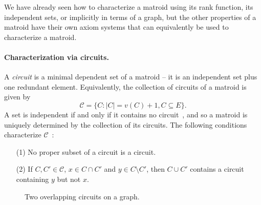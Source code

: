 We have already seen how to characterize a matroid using its rank function, its independent sets, or implicitly in terms of a graph, but the other properties of a matroid have their own axiom systems that can equivalently be used to characterize a matroid.

\paragraph{Characterization via circuits.} A \textit{circuit} is a minimal dependent set of a matroid -- it is an independent set plus one redundant element. Equivalently, the collection of circuits of a matroid is given by
$$\mathcal{C} = \bigl\{ C : |C| = v(C) + 1, C\subseteq E \bigr\}.$$
A set is independent if and only if it contains no circuit~\cite{schrijver-2003}, and so a matroid is uniquely determined by the collection of its circuits. The following conditions characterize $\mathcal{C}$~\cite{whitney-1935}:
\begin{enumerate}
  \item[(1)] No proper subset of a circuit is a circuit.
  \item[(2)] If $C, C'\in\mathcal{C}$, $x\in C\cap C'$ and $y\in C\setminus C'$, then $C\cup C'$ contains a circuit containing $y$ but not $x$.
\end{enumerate}

\begin{figure}
  \centering
  \caption{Two overlapping circuits on a graph.}
  \label{fig:ex-graph-circuits}
\end{figure}


